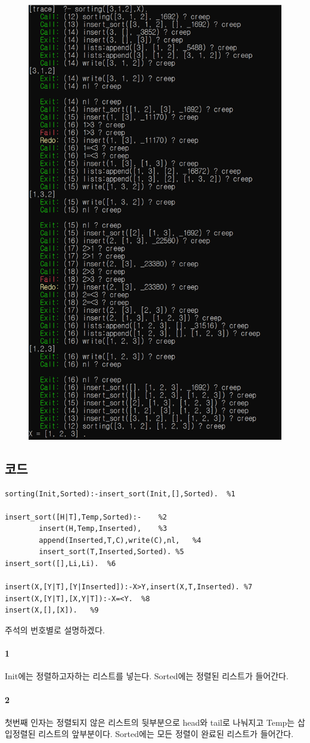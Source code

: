 \documentclass{oblivoir}
\begin{document}
\begin{figure}[H]
    
    \includegraphics[width=0.5\linewidth]{trace_a.PNG}
    
\end{figure}


\subsection{코드}
\begin{verbatim}
sorting(Init,Sorted):-insert_sort(Init,[],Sorted).  %1

insert_sort([H|T],Temp,Sorted):-    %2
        insert(H,Temp,Inserted),    %3
        append(Inserted,T,C),write(C),nl,   %4
        insert_sort(T,Inserted,Sorted). %5
insert_sort([],Li,Li).  %6

insert(X,[Y|T],[Y|Inserted]):-X>Y,insert(X,T,Inserted). %7
insert(X,[Y|T],[X,Y|T]):-X=<Y.  %8
insert(X,[],[X]).   %9
\end{verbatim}
주석의 번호별로 설명하겠다.
\paragraph*{1}
Init에는 정렬하고자하는 리스트를 넣는다. Sorted에는 정렬된 리스트가 들어간다.

\paragraph*{2}
첫번째 인자는 정렬되지 않은 리스트의 뒷부분으로 head와 tail로 나눠지고 Temp는 삽입정렬된 리스트의 앞부분이다. Sorted에는 모든 정렬이 완료된 리스트가 들어간다.
\end{document}
